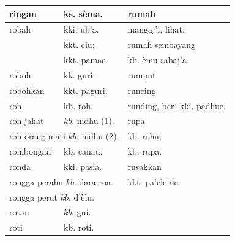 \documentclass[10pt]{article}
\begin{document}
\begin{center}
\begin{tabular}{|l|l|l|}
\hline
ringan & ks. sèma. & rumah \\
\hline
robah & kki. ub'a. & mangaj'i, lihat: \\
\hline
 & kkt. ciu; & rumah sembayang \\
\hline
 & kkt. pamae. & kb. èmu sabaj'a. \\
\hline
roboh & kk. guri. & rumput \\
\hline
robohkan & kkt. paguri. & runcing \\
\hline
roh & kb. roh. & runding, ber- kki. padhue. \\
\hline
roh jahat & \(k b\). nidhu (1). & rupa \\
\hline
\multicolumn{2}{|c|}{roh orang mati \(k b\). nidhu (2).} & kb. rohu; \\
\hline
rombongan & kb. canau. & kb. rupa. \\
\hline
ronda & kki. pasia. & rusakkan \\
\hline
\multicolumn{2}{|l|}{rongga perahu \(k b\). dara roa.} & kkt. pa'ele iie. \\
\hline
\multicolumn{2}{|l|}{rongga perut \(k b\). d'èlu.} &  \\
\hline
rotan & \(k b\). gui. &  \\
\hline
roti & kb. roti. &  \\
\hline
\end{tabular}
\end{center}
\end{document}
